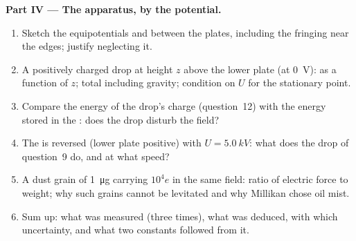 \begin{problem}
\medskip
\noindent\textbf{Part IV --- The apparatus, by the potential.}
\begin{enumerate}[resume]
  \item Sketch the equipotentials and  between the plates,
        including the fringing near the edges; justify neglecting it.
  \item A positively charged drop at height $z$ above the lower plate
        (at \qty{0}{V}):  as a function of $z$; total
         including gravity; condition on $U$ for the
        stationary point.
  \item Compare the energy of the drop's charge (question~12) with the
        energy stored in the : does the drop disturb the field?
  \item The  is reversed (lower plate positive) with
        $U = \qty{5.0}{kV}$: what does the drop of question~9 do, and at
        what speed?
  \item A dust grain of \qty{1}{\micro g} carrying $10^4e$ in the same
        field: ratio of electric force to weight; why such grains cannot
        be levitated and why Millikan chose oil mist.
  \item Sum up: what was measured (three times), what was deduced,
        with which uncertainty, and what two constants followed from it.
\end{enumerate}
\end{problem}
